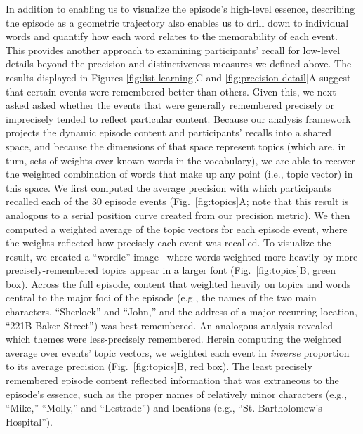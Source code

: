 \documentclass[10pt]{article}
\renewcommand{\includegraphics}[2][]{} %
\providecommand{\DIFaddtex}[1]{{\protect\color{blue}\uwave{#1}}} %
\providecommand{\DIFdeltex}[1]{{\protect\color{red}\sout{#1}}}                      %
\providecommand{\DIFaddbegin}{} %
\providecommand{\DIFaddend}{} %
\providecommand{\DIFdelbegin}{} %
\providecommand{\DIFdelend}{} %
\providecommand{\DIFadd}[1]{\texorpdfstring{\DIFaddtex{#1}}{#1}} %
\providecommand{\DIFdel}[1]{\texorpdfstring{\DIFdeltex{#1}}{}} %
\newcommand{\DIFscaledelfig}{0.5}
\newlength{\DIFdelgraphicswidth} %
\newlength{\DIFdelgraphicsheight} %
\newcommand{\DIFaddincludegraphics}[2][]{{\color{blue}\fbox{\DIFOincludegraphics[#1]{#2}}}} %
\newcommand{\DIFdelincludegraphics}[2][]{%
\sbox{\DIFdelgraphicsbox}{\DIFOincludegraphics[#1]{#2}}%
\settoboxwidth{\DIFdelgraphicswidth}{\DIFdelgraphicsbox} %
\settoboxtotalheight{\DIFdelgraphicsheight}{\DIFdelgraphicsbox} %
\scalebox{\DIFscaledelfig}{%
\parbox[b]{\DIFdelgraphicswidth}{\usebox{\DIFdelgraphicsbox}\\[-\baselineskip] \rule{\DIFdelgraphicswidth}{0em}}\llap{\resizebox{\DIFdelgraphicswidth}{\DIFdelgraphicsheight}{%
\setlength{\unitlength}{\DIFdelgraphicswidth}%
\begin{picture}(1,1)%
\thicklines\linethickness{2pt} %
{\color[rgb]{1,0,0}\put(0,0){\framebox(1,1){}}}%
{\color[rgb]{1,0,0}\put(0,0){\line( 1,1){1}}}%
{\color[rgb]{1,0,0}\put(0,1){\line(1,-1){1}}}%
\end{picture}%
}\hspace*{3pt}}} %
} %
\DeclareRobustCommand{\DIFaddbegin}{\DIFOaddbegin \let\includegraphics\DIFaddincludegraphics} %
\DeclareRobustCommand{\DIFaddend}{\DIFOaddend \let\includegraphics\DIFOincludegraphics} %
\DeclareRobustCommand{\DIFdelbegin}{\DIFOdelbegin \let\includegraphics\DIFdelincludegraphics} %
\DeclareRobustCommand{\DIFdelend}{\DIFOaddend \let\includegraphics\DIFOincludegraphics} %
\begin{document}
In addition to enabling us to visualize the episode's high-level essence, describing the episode as a geometric trajectory also enables us to drill down to individual words and quantify how each word relates to the memorability of each event.  This provides another approach to examining participants' recall for low-level details beyond the precision and distinctiveness measures we defined above.  The results displayed in Figures \ref{fig:list-learning}C and \ref{fig:precision-detail}A suggest that certain events were remembered better than others.  Given this, we next asked \DIFdelbegin \DIFdel{asked }\DIFdelend whether the events that were generally remembered precisely or imprecisely tended to reflect particular content.  Because our analysis framework projects the dynamic episode content and participants' recalls into a shared space, and because the dimensions of that space represent topics (which are, in turn, sets of weights over known words in the vocabulary), we are able to recover the weighted combination of words that make up any point (i.e., topic vector) in this space.  We first computed the average precision with which participants recalled each of the 30 episode events (Fig.~\ref{fig:topics}A; note that this result is analogous to a serial position curve created from our precision metric).  We then computed a weighted average of the topic vectors for each episode event, where the weights reflected how precisely each event was recalled.  To visualize the result, we created a ``wordle'' image~\citep{MuelEtal18} where words weighted more heavily by more \DIFdelbegin \DIFdel{precisely-remembered }\DIFdelend \DIFaddbegin \DIFadd{precisely remembered }\DIFaddend topics appear in a larger font (Fig.~\ref{fig:topics}B, green box).  Across the full episode, content that weighted heavily on topics and words central to the major foci of the episode (e.g., the names of the two main characters, ``Sherlock'' and ``John,'' and the address of a major recurring location, ``221B Baker Street'') was best remembered.  An analogous analysis revealed which themes were less-precisely remembered.  Here\DIFaddbegin \DIFadd{, }\DIFaddend in computing the weighted average over events' topic vectors, we weighted each event in \DIFdelbegin \textit{\DIFdel{inverse}} %
\DIFdelend \DIFaddbegin \DIFadd{inverse }\DIFaddend proportion to its average precision (Fig.~\ref{fig:topics}B, red box).  The least precisely remembered episode content reflected information that was extraneous to the episode's essence, such as the proper names of relatively minor characters (e.g., ``Mike,'' ``Molly,'' and ``Lestrade'') and locations (e.g., ``St. Bartholomew's Hospital'').
\end{document}
